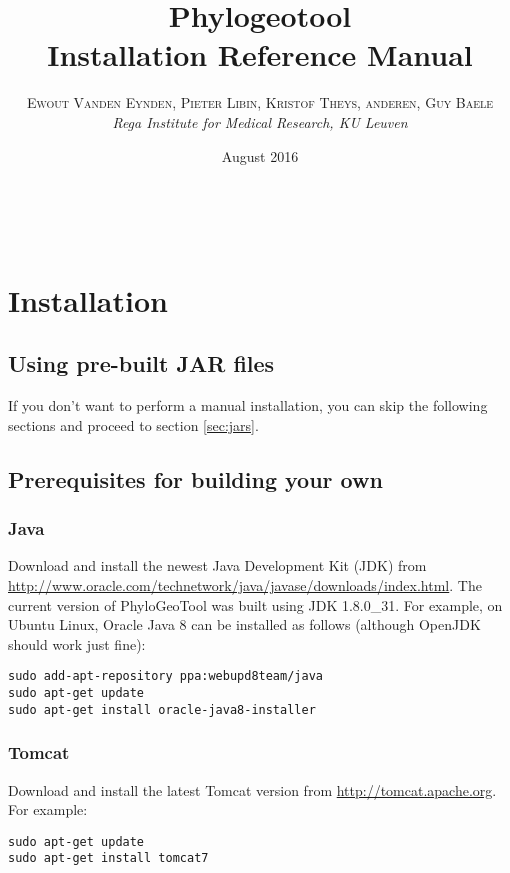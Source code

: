 \documentclass[a4paper, 11pt]{article} %
\title{\textbf{Phylogeotool}\\ %
Installation Reference Manual} %
\author{\textsc{Ewout Vanden Eynden, Pieter Libin, Kristof Theys, anderen, Guy Baele} %
\\{\textit{Rega Institute for Medical Research, KU Leuven}}} %
\date{August 2016} %
\makeatletter
\renewcommand{\maketitle}{ %
\begin{flushright} %
{\LARGE\@title} %

\vspace{50pt} %

{\large\@author} %
\\\@date %

\vspace{40pt} %
\end{flushright}
}
\makeatother
\begin{document}
\maketitle %

\vspace{30pt} %

\tableofcontents
\newpage

\section{Installation}

\subsection{Using pre-built JAR files}
If you don't want to perform a manual installation, you can skip the following sections and proceed to section \ref{sec:jars}.


\subsection{Prerequisites for building your own}

\subsubsection*{Java}
Download and install the newest Java Development Kit (JDK) from \url{http://www.oracle.com/technetwork/java/javase/downloads/index.html}.
The current version of PhyloGeoTool was built using JDK 1.8.0\_31.
For example, on Ubuntu Linux, Oracle Java 8 can be installed as follows (although OpenJDK should work just fine):
\begin{verbatim} 
sudo add-apt-repository ppa:webupd8team/java
sudo apt-get update
sudo apt-get install oracle-java8-installer
\end{verbatim}

\subsubsection*{Tomcat}
Download and install the latest Tomcat version from \url{http://tomcat.apache.org}.
For example:
\begin{verbatim}
sudo apt-get update
sudo apt-get install tomcat7
\end{verbatim}
\end{document}
